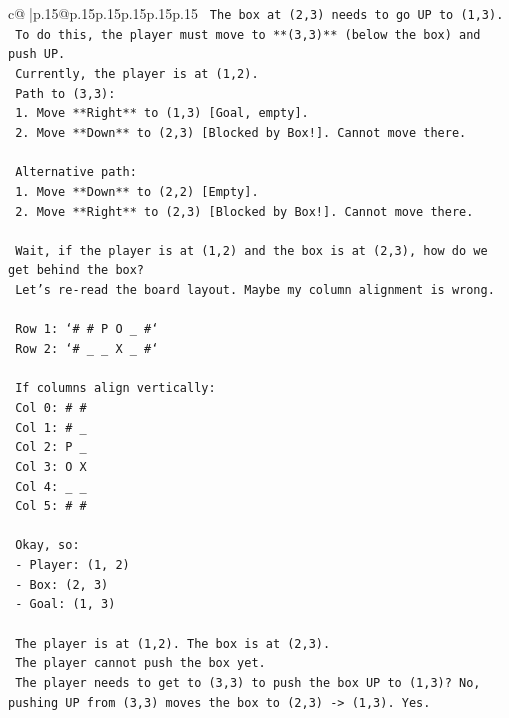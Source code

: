 \documentclass{article}
\begin{document}
{\begin{supertabular}{c@{$\;$}|p{.15\linewidth}@{}p{.15\linewidth}p{.15\linewidth}p{.15\linewidth}p{.15\linewidth}p{.15\linewidth}}
{{{\texttt{   The box at (2,3) needs to go UP to (1,3).} \\
\texttt{   To do this, the player must move to **(3,3)** (below the box) and push UP.} \\
\texttt{   Currently, the player is at (1,2).} \\
\texttt{   Path to (3,3):} \\
\texttt{   1. Move **Right** to (1,3) {[}Goal, empty{]}.} \\
\texttt{   2. Move **Down** to (2,3) {[}Blocked by Box!{]}. Cannot move there.} \\
\\ 
\texttt{   Alternative path:} \\
\texttt{   1. Move **Down** to (2,2) {[}Empty{]}.} \\
\texttt{   2. Move **Right** to (2,3) {[}Blocked by Box!{]}. Cannot move there.} \\
\\ 
\texttt{   Wait, if the player is at (1,2) and the box is at (2,3), how do we get behind the box?} \\
\texttt{   Let's re{-}read the board layout. Maybe my column alignment is wrong.} \\
\\ 
\texttt{   Row 1: `\# \# P O \_ \#`} \\
\texttt{   Row 2: `\# \_ \_ X \_ \#`} \\
\\ 
\texttt{   If columns align vertically:} \\
\texttt{   Col 0: \# \#} \\
\texttt{   Col 1: \# \_} \\
\texttt{   Col 2: P \_} \\
\texttt{   Col 3: O X} \\
\texttt{   Col 4: \_ \_} \\
\texttt{   Col 5: \# \#} \\
\\ 
\texttt{   Okay, so:} \\
\texttt{   {-} Player: (1, 2)} \\
\texttt{   {-} Box: (2, 3)} \\
\texttt{   {-} Goal: (1, 3)} \\
\\ 
\texttt{   The player is at (1,2). The box is at (2,3).} \\
\texttt{   The player cannot push the box yet.} \\
\texttt{   The player needs to get to (3,3) to push the box UP to (1,3)? No, pushing UP from (3,3) moves the box to (2,3) {-}> (1,3). Yes.} \\
}}}
\end{supertabular}}
\end{document}
